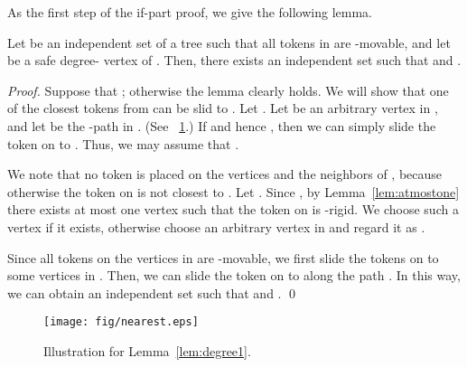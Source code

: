 \documentclass{llncs}
\newcounter{one}
\begin{document}
	As the first step of the if-part proof, we give the following lemma. 
	\begin{lemma} \label{lem:degree1}
	Let  be an independent set of a tree  such that all tokens in  are -movable, and let  be a safe degree- vertex of . 
	Then, there exists an independent set  such that  and .
\end{lemma}
	\begin{proof}
	Suppose that ; otherwise the lemma clearly holds. 
	We will show that one of the closest tokens from  can be slid to .
	Let .
	Let  be an arbitrary vertex in , and let  be the -path in .
(See \figurename~\ref{fig:nearest}.)
	If  and hence , then we can simply slide the token on  to . 
	Thus, we may assume that . 

	We note that no token is placed on the vertices  and the neighbors of , 
because otherwise the token on  is not closest to . 
	Let .
Since , by Lemma~\ref{lem:atmostone} there exists at most one vertex  such that the token on  is -rigid. 
	We choose such a vertex  if it exists, otherwise choose an arbitrary vertex in  and regard it as . 
	
	Since all tokens on the vertices  in  are -movable, we first slide the tokens on  to some vertices in .
	Then, we can slide the token on  to  along the path . 
	In this way, we can obtain an independent set  such that  and .
	\qed
	\end{proof}
\begin{figure}[t]
\begin{center}
	\texttt{[image: fig/nearest.eps]}
	\end{center}
	\vspace{-1em}
	\caption{Illustration for Lemma~\ref{lem:degree1}.}
	\label{fig:nearest}
\end{figure}
\end{document}
